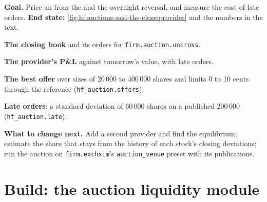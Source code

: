 \begin{tutorial}
\textbf{Goal.} Price an  from the  and the overnight reversal, and measure the cost of late orders.
\textbf{End state:} \cref{fig:hf:auctions-and-the-close:provider} and the numbers in the text.
\begin{tutsteps}
\item \textbf{The closing book} and its orders for \texttt{firm.auction.uncross}.
\label{lst:hf:auctions-and-the-close:book}
\item \textbf{The provider's P\&L} against tomorrow's value, with late orders.
\label{lst:hf:auctions-and-the-close:provider}
\item \textbf{The best offer} over sizes of 20\,000 to 400\,000 shares and limits 0 to 10 cents through the reference (\texttt{hf\_auction.offers}).
\item \textbf{Late orders}: a standard deviation of 60\,000 shares on a published 200\,000 (\texttt{hf\_auction.late}).
\end{tutsteps}
\textbf{What to change next.} Add a second provider and find the equilibrium; estimate the share that stays from the history of each stock's
closing deviations; run the auction on \texttt{firm.exchsim}'s \texttt{auction\_venue} preset with its publications.
\end{tutorial}

\section{Build: the auction liquidity module}\label{bld:hf:auctions-and-the-close:auctionmm}

